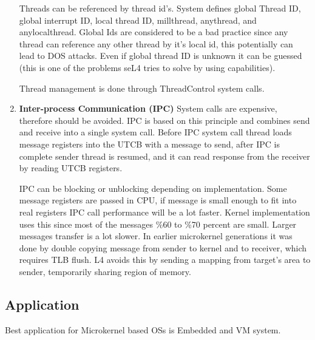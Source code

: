 \documentclass{article}
\begin{document}
\begin{enumerate}[1., leftmargin = 0.7cm, nosep]
                Threads can be referenced by thread id's. System defines global Thread ID,
                global interrupt ID, local thread ID, millthread, anythread, and
                anylocalthread. Global Ids are considered to be a bad practice since any thread
                can reference any other thread by it's local id, this potentially can lead to
                DOS attacks. Even if global thread ID is unknown it can be guessed (this is one
                of the problems seL4 tries to solve by using capabilities).

                Thread management is done through ThreadControl system calls.

            \item \textbf{Inter-process Communication (IPC)}
                System calls are expensive, therefore should be avoided. IPC is based on this
                principle and combines send and receive into a single system call.
                Before IPC system call thread loads message registers into the UTCB with a
                message to send, after IPC is complete sender thread is resumed, and it can
                read response from the receiver by reading UTCB registers.

                IPC can be blocking or unblocking depending on implementation. Some message
                registers are passed in CPU, if message is small enough to fit into real
                registers IPC call performance will be a lot faster. Kernel implementation uses
                this since most of the messages \%60 to \%70 percent are small. Larger messages
                transfer is a lot slower. In earlier microkernel generations it was done by
                double copying message from sender to kernel and to receiver, which requires
                TLB flush. L4 avoids this by
                sending a mapping from target's area to sender, temporarily sharing region of
                memory.

        \end{enumerate}


    \pagebreak

    \subsection{Application}

    Best application for Microkernel based OSs is Embedded and VM system.
\end{document}
